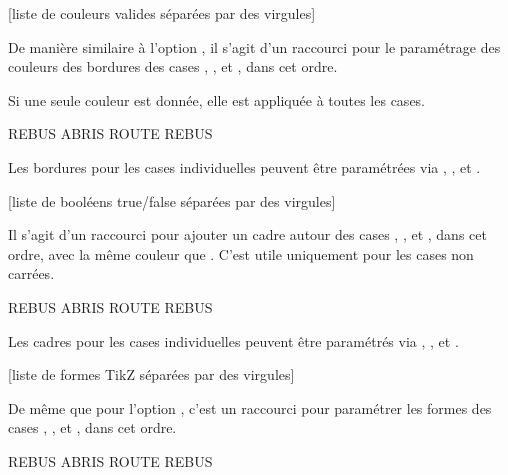 \documentclass[svgnames]{report}
\begin{document}
  [liste de couleurs valides séparées par des virgules]

  De manière similaire à l'option , il s'agit d'un raccourci pour le paramétrage des couleurs des bordures des cases , ,
   et , dans cet ordre.

  Si une seule couleur est donnée, elle est appliquée à toutes les cases.

  \begin{example}
  \begin{GrilleSutom}[CouleurBordures={red,orange,blue}]{REBUS}
    ABRIS
    ROUTE
    REBUS
  \end{GrilleSutom}
  \end{example}

  Les bordures pour les cases individuelles peuvent être paramétrées via
  , ,  et .

  [liste de booléens true/false séparées par des virgules]

  Il s'agit d'un raccourci pour ajouter un cadre autour des cases , ,  et , dans cet ordre, avec la même couleur que . C'est utile uniquement pour les cases non carrées.

  \begin{example}
  \begin{GrilleSutom}[Cadres={false,true,true},
                      Formes=circle]{REBUS}
    ABRIS
    ROUTE
    REBUS
  \end{GrilleSutom}
  \end{example}

  Les cadres pour les cases individuelles peuvent être paramétrés via , ,
   et .

  [liste de formes TikZ séparées par des virgules]

  De même que pour l'option , c'est un raccourci pour paramétrer les formes des cases , ,
   et , dans cet ordre.

  \begin{example}
  \begin{GrilleSutom}[Formes={circle, rectangle, circle}]{REBUS}
    ABRIS
    ROUTE
    REBUS
  \end{GrilleSutom}
  \end{example}
\end{document}
